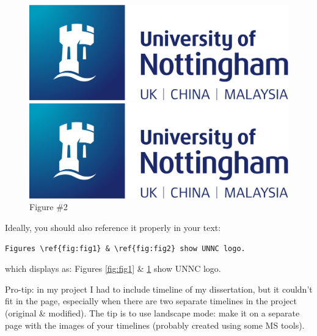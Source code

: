 \begin{figure}[H]
\centering
\begin{minipage}{.5\textwidth}
  \centering
  \includegraphics[width=.8\linewidth]{images/nottingham-logo.png}
  \caption{Figure \#1}
  \label{fig:fig1}
\end{minipage}%
\begin{minipage}{.5\textwidth}
  \centering
  \includegraphics[width=.8\linewidth]{images/nottingham-logo.png}
  \caption{Figure \#2}
  \label{fig:fig2}
\end{minipage}
\end{figure}

Ideally, you should also reference it properly in your text:

\begin{verbatim}
Figures \ref{fig:fig1} & \ref{fig:fig2} show UNNC logo.
\end{verbatim}

which displays as: Figures \ref{fig:fig1} \& \ref{fig:fig2} show UNNC logo.

Pro-tip: in my project I had to include timeline of my dissertation, but it couldn't fit in the page, especially when there are two separate timelines in the project (original \& modified). The tip is to use landscape mode: make it on a separate page with the images of your timelines (probably created using some MS tools).

